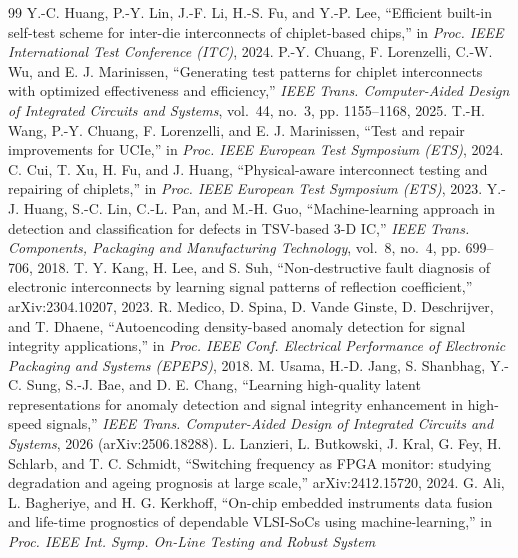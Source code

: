 \documentclass[11pt,a4paper,fontset=mac]{ctexart}
\begin{document}
\begin{thebibliography}{99}\small
{} Y.-C. Huang, P.-Y. Lin, J.-F. Li, H.-S. Fu, and Y.-P. Lee,
``Efficient built-in self-test scheme for inter-die interconnects of chiplet-based chips,''
in \emph{Proc. IEEE International Test Conference (ITC)}, 2024.
 P.-Y. Chuang, F. Lorenzelli, C.-W. Wu, and E. J. Marinissen,
``Generating test patterns for chiplet interconnects with optimized effectiveness and efficiency,''
\emph{IEEE Trans. Computer-Aided Design of Integrated Circuits and Systems}, vol.~44, no.~3,
pp. 1155--1168, 2025.
 T.-H. Wang, P.-Y. Chuang, F. Lorenzelli, and E. J. Marinissen,
``Test and repair improvements for UCIe,'' in \emph{Proc. IEEE European Test Symposium (ETS)}, 2024.
 C. Cui, T. Xu, H. Fu, and J. Huang,
``Physical-aware interconnect testing and repairing of chiplets,''
in \emph{Proc. IEEE European Test Symposium (ETS)}, 2023.
 Y.-J. Huang, S.-C. Lin, C.-L. Pan, and M.-H. Guo,
``Machine-learning approach in detection and classification for defects in TSV-based 3-D IC,''
\emph{IEEE Trans. Components, Packaging and Manufacturing Technology}, vol.~8, no.~4,
pp. 699--706, 2018.
 T. Y. Kang, H. Lee, and S. Suh,
``Non-destructive fault diagnosis of electronic interconnects by learning signal patterns of
reflection coefficient,'' arXiv:2304.10207, 2023.
 R. Medico, D. Spina, D. Vande Ginste, D. Deschrijver, and T. Dhaene,
``Autoencoding density-based anomaly detection for signal integrity applications,''
in \emph{Proc. IEEE Conf. Electrical Performance of Electronic Packaging and Systems (EPEPS)}, 2018.
 M. Usama, H.-D. Jang, S. Shanbhag, Y.-C. Sung, S.-J. Bae, and D. E. Chang,
``Learning high-quality latent representations for anomaly detection and signal integrity
enhancement in high-speed signals,'' \emph{IEEE Trans. Computer-Aided Design of Integrated
Circuits and Systems}, 2026 (arXiv:2506.18288).
 L. Lanzieri, L. Butkowski, J. Kral, G. Fey, H. Schlarb, and
T. C. Schmidt, ``Switching frequency as FPGA monitor: studying degradation and ageing prognosis
at large scale,'' arXiv:2412.15720, 2024.
 G. Ali, L. Bagheriye, and H. G. Kerkhoff,
``On-chip embedded instruments data fusion and life-time prognostics of dependable VLSI-SoCs
using machine-learning,'' in \emph{Proc. IEEE Int. Symp. On-Line Testing and Robust System
}
\end{thebibliography}
\end{document}
